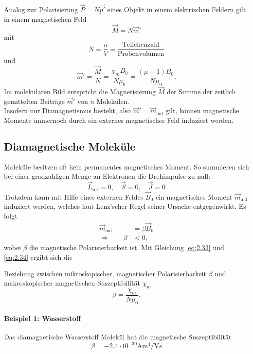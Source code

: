 	Analog zur Polarisierung $\Vec{P} = N \Vec{p'}$ eines Objekt in einem elektrischen Feldern gilt in einem magnetischen Feld
	\begin{equation}
		\label{2eq:.32}
		\Vec{M} = N \Vec{m}'
	\end{equation}
	mit
	$$
	N = \frac{n}{V} = \frac{\text{Teilchenzahl}}{\text{Probenvolumen}}
	$$ 
	und
	\begin{equation}
		\label{eq:2.33}
		\Vec{m}' = \frac{\Vec{M}}{N} = \frac{ \chi_{m} B_0}{N \mu_0} = \frac{\left( \mu -1 \right) B_0}{N \mu_0}.
	\end{equation}
	Im molekularen Bild entspricht die Magnetisierung $\Vec{M}$ der Summe der zeitlich gemittelten Beiträge $\Vec{m}'$ von $n$ Molekülen. \\[-1em]
	
	Insofern nur Diamagnetismus besteht, also $\Vec{m}' = \vec m_{\text{ind}}$ gilt, können magnetische Momente immernoch durch ein externes magnetisches Feld induziert werden.

	\subsection{Diamagnetische Moleküle} 
	Moleküle besitzen oft kein permanentes magnetisches Moment. So summieren sich bei einer gradzahligen Menge an Elektronen die Drehimpulse zu null:
	$$
	\Vec{L}_{\text{tot}} = 0, \quad \Vec{S}= 0 , \quad \Vec{J} = 0 
	$$
	Trotzdem kann mit Hilfe eines externen Feldes $\Vec{B}_{0}$ ein magnetisches Moment $\Vec{m}_{\text{ind}}$ induziert werden, welches laut Lenz'scher Regel seiner Ursache entgegenwirkt. Es folgt
	\begin{align}
		\label{eq:2.34}
		\Vec{m}_{\text{ind}} &= \beta \Vec{B}_{0}\\
		\Rightarrow  \qquad\beta &< 0,
	\end{align}
	wobei $\beta$ die magnetische Polarisierbarkeit ist. Mit Gleichung \eqref{eq:2.33} und \eqref{eq:2.34} ergibt sich die
	\begin{important}
		Beziehung zwischen mikroskopischer, magnetischer Polarisierbarkeit $\beta$ und makroskopischer magnetischen Suszeptibilität $\chi_m$
		$$
		\beta = \frac{\chi_{m}}{N \mu_0}.
		$$
	\end{important}
	\paragraph{Beispiel 1: Wasserstoff }  Das diamagnetische Wasserstoff Molekül  hat die magnetische Suszeptibilität
	$$
	\beta = -\SI{2,4}{\cdot 10^{-30} \ampere \meter^4 \per \volt \second}
	$$
